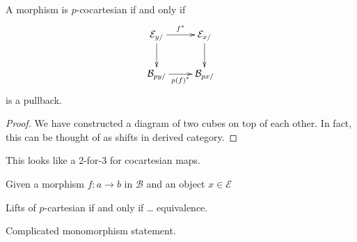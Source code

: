 \begin{exercise}
\label{exercise-3.6}
A morphism is $p$-cocartesian if and only if
$$
\xymatrix{
\mathcal{E}_{y/}\ar[r]^{f^*}\ar[d]&\mathcal{E}_{x/}\ar[d]\\
\mathcal{B}_{py/}\ar[r]_{p(f)^*}&\mathcal{B}_{px/}
}
$$
is a pullback.
\end{exercise}

\begin{proof}
We have constructed a diagram of two cubes on top of each other.
In fact, this can be thought of as shifts in derived category.
\end{proof}

\begin{lemma}
\label{lemma-3.5.3}
This looks like a 2-for-3 for cocartesian maps.
\end{lemma}

\begin{definition}
\label{definition-cocartesian-lift}
Given a morphism $f:a \to b$ in $\mathcal{B}$
and an object $x \in \mathcal{E}$
\end{definition}

\begin{lemma}
\label{lemma-3.5.5.}
Lifts of $p$-cartesian if and only if … equivalence.
\end{lemma}

\begin{lemma}
\label{lemma-3.5.6}
Complicated monomorphism statement.
\end{lemma}

